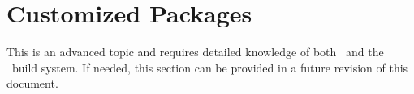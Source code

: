 
\section{Customized Packages}
\label{sec:customize}

This is an advanced topic and requires detailed knowledge of both \cmake\ and the \draco\ build system.  If needed, this section can be provided in a future revision of this document.




